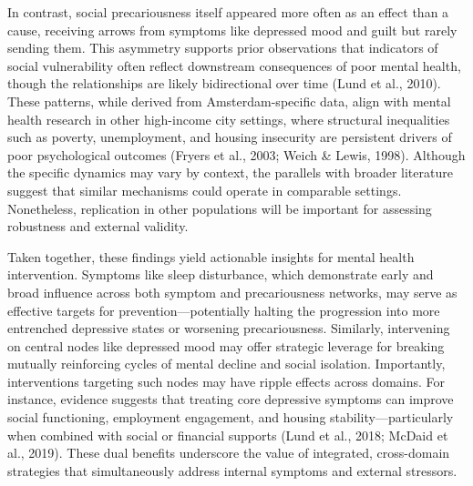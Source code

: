 \documentclass[
]{article}
\begin{document}
In contrast, social precariousness itself appeared more often as an
effect than a cause, receiving arrows from symptoms like depressed mood
and guilt but rarely sending them. This asymmetry supports prior
observations that indicators of social vulnerability often reflect
downstream consequences of poor mental health, though the relationships
are likely bidirectional over time (Lund et al., 2010). These patterns,
while derived from Amsterdam-specific data, align with mental health
research in other high-income city settings, where structural
inequalities such as poverty, unemployment, and housing insecurity are
persistent drivers of poor psychological outcomes (Fryers et al., 2003;
Weich \& Lewis, 1998). Although the specific dynamics may vary by
context, the parallels with broader literature suggest that similar
mechanisms could operate in comparable settings. Nonetheless,
replication in other populations will be important for assessing
robustness and external validity.

Taken together, these findings yield actionable insights for mental
health intervention. Symptoms like sleep disturbance, which demonstrate
early and broad influence across both symptom and precariousness
networks, may serve as effective targets for prevention---potentially
halting the progression into more entrenched depressive states or
worsening precariousness. Similarly, intervening on central nodes like
depressed mood may offer strategic leverage for breaking mutually
reinforcing cycles of mental decline and social isolation. Importantly,
interventions targeting such nodes may have ripple effects across
domains. For instance, evidence suggests that treating core depressive
symptoms can improve social functioning, employment engagement, and
housing stability---particularly when combined with social or financial
supports (Lund et al., 2018; McDaid et al., 2019). These dual benefits
underscore the value of integrated, cross-domain strategies that
simultaneously address internal symptoms and external stressors.
\end{document}
